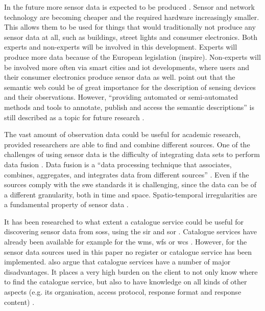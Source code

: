 In the future more sensor data is expected to be produced \citep{IoT:PWC}. Sensor and network technology are becoming cheaper and the required hardware increasingly smaller. This allows them to be used for things that would traditionally not produce any sensor data at all, such as buildings, street lights and consumer electronics. Both experts and non-experts will be involved in this development. Experts will produce more data because of the European legislation (\ac{inspire}). Non-experts will be involved more often via smart cities and \ac{iot} developments, where users and their consumer electronics produce sensor data as well. \cite{IOT:Barnaghi} point out that the semantic web could be of great importance for the description of sensing devices and their observations. However, \enquote{providing automated or semi-automated methods and tools to annotate, publish and access the semantic descriptions} is still described as a topic for future research \cite[p. 19]{IOT:Barnaghi}. 

The vast amount of observation data could be useful for academic research, provided researchers are able to find and combine different sources. One of the challenges of using sensor data is the difficulty of integrating data sets to perform data fusion \citep{SSW:Corcho, SSW:Ji, SSW:Wang}. Data fusion is a \enquote{data processing technique that associates, combines, aggregates, and integrates data from different sources} \cite[p. 2]{SSW:Wang2}. Even if the sources comply with the \ac{swe} standards it is challenging, since the data can be of a different granularity, both in time and space. Spatio-temporal irregularities are a fundamental property of sensor data \citep{SW:Ganesan}. 

It has been researched to what extent a catalogue service could be useful for discovering sensor data from \aclp{sos}, using the \ac{sir} \citep{SW:OGC3} and \ac{sor} \citep{SW:OGC4}. Catalogue services have already been available for example for the \ac{wms}, \ac{wfs} or \ac{wcs} \citep{SDI:OGC2}. However, for the sensor data sources used in this paper no register or catalogue service has been implemented. \cite{SSW:Atkinson} also argue that catalogue services have a number of major disadvantages. It places a very high burden on the client to not only know where to find the catalogue service, but also to have knowledge on all kinds of other aspects (e.g. its organisation, access protocol, response format and response content) \cite[p. 128]{SSW:Atkinson}. 

